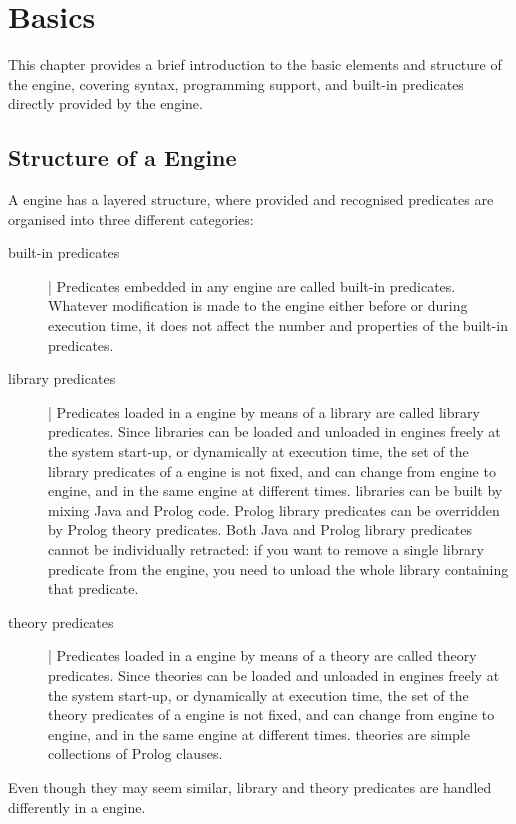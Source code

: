 \chapter{\tuprolog{} Basics}
\label{ch:engine}
%
%
%

\noindent This chapter provides a brief introduction to the basic elements and structure of the \tuprolog{} engine, covering syntax, programming support, and built-in predicates directly provided by the engine.

\section{Structure of a \tuprolog{} Engine}

\noindent A \tuprolog{} engine has a layered structure, where provided and recognised predicates are organised into three different categories:
%
\begin{description}
\item[built-in predicates] |
Predicates embedded in any \tuprolog{} engine are called built-in predicates.
%
Whatever modification is made to the engine either before or during execution time, it does not affect the number and properties of the built-in predicates.
%
\item[library predicates] |
Predicates loaded in a \tuprolog{} engine by means of a \tuprolog{} library are called library predicates.
%
Since libraries can be loaded and unloaded in \tuprolog{} engines freely at the system start-up, or dynamically at execution time, the set of the library predicates of a \tuprolog{} engine is not fixed, and can change from engine to engine, and in the same engine at different times.
%
\tuprolog{} libraries can be built by mixing Java and Prolog code. Prolog
library predicates can be overridden by Prolog theory predicates. Both Java and
Prolog library predicates cannot be individually retracted: if you want to
remove a single library predicate from the engine, you need to unload the whole
library containing that predicate.
\item[theory predicates] |
Predicates loaded in a \tuprolog{} engine by means of a \tuprolog{} theory are called theory predicates.
%
Since theories can be loaded and unloaded in \tuprolog{} engines freely at the system start-up, or dynamically at execution time, the set of the theory predicates of a \tuprolog{} engine is not fixed, and can change from engine to engine, and in the same engine at different times. 
%
\tuprolog{} theories are simple collections of Prolog clauses.
\end{description}
%
Even though they may seem similar, library and theory predicates are handled differently in a \tuprolog{} engine.


